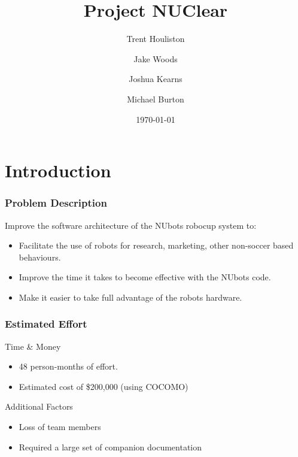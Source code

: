 \documentclass{beamer}
\title[Short title]{Project NUClear}
\author{
	Trent Houliston \and Jake Woods \and Joshua Kearns \and Michael Burton
}
\institute[UoN]
{
	University of Newcastle \\ %
	\medskip
	\textit{Trent.Houliston@uon.edu.au, Jake.f.woods@gmail.com} %
}
\date{\today}
\begin{document}
\begin{frame}
	\titlepage %
\end{frame}

\begin{frame}
	\tableofcontents
\end{frame}

\section{Introduction}
\begin{frame}
\end{frame}

\begin{frame}
	\frametitle{Problem Description}
		Improve the software architecture of the NUbots robocup system to:
		\begin{itemize}
			\item Facilitate the use of robots for research, marketing, other non-soccer based behaviours.
			\item Improve the time it takes to become effective with the NUbots code.
			\item Make it easier to take full advantage of the robots hardware.
		\end{itemize}
\end{frame}

\begin{frame}
	\frametitle{Estimated Effort}
		Time \& Money
		\begin{itemize}
			\item 48 person-months of effort.
			\item Estimated cost of \$200,000 (using COCOMO)
		\end{itemize}
		
		Additional Factors
		\begin{itemize}
			\item Loss of team members
			\item Required a large set of companion documentation
		\end{itemize}
\end{frame}
\end{document}
